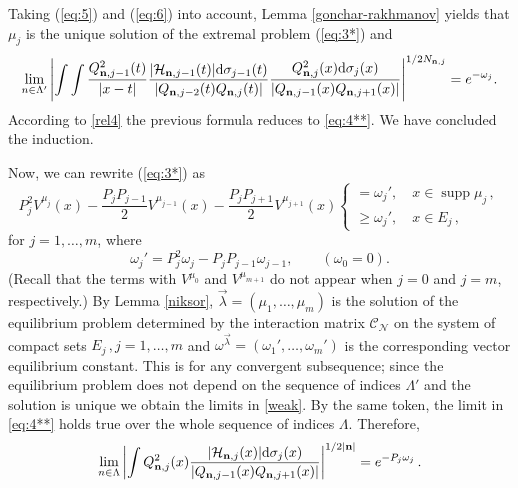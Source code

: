 \documentclass{amsart}
\theoremstyle{definition}
\theoremstyle{remark}
\newcommand{\supp}{\operatorname{supp }}
\begin{document}
\medskip

Taking (\ref{eq:5}) and (\ref{eq:6}) into account, Lemma
\ref{gonchar-rakhmanov} yields that $\mu_j$ is the unique solution
of the extremal problem (\ref{eq:3*}) and
\[  \lim_{n \in \Lambda'} \left|\int   \int \frac{Q_{{\bf n},j-1}^2(t)}{|x-t|}\frac{ |{\mathcal{H}}_{{\bf n},j-1}(t)|{\rm d}\sigma_{j-1}(t)}{|Q_{{\bf n},j-2}(t)Q_{{\bf n},j}(t)|}
\frac{Q_{{\bf n},j}^2(x){\rm d}\sigma_j(x)}{|Q_{{\bf n},j-1}(x)Q_{{\bf n},j+1}(x)|}\right|^{1/2N_{{\bf n},j} } = e^{-\omega_j}.
\]
According to \eqref{rel4} the previous formula reduces to \eqref{eq:4**}. We have concluded the induction.

\medskip

Now, we can rewrite (\ref{eq:3*}) as
\begin{equation} \label{eq:a1}
 P_j^2V^{\mu_j}(x) - \frac{P_jP_{j-1}}{2}V^{\mu_{j-1}}(x) -
\frac{P_jP_{j+1}}{2 }V^{\mu_{j+1}}(x)  \left\{
\begin{array}{l} = \omega_j',\quad x
\in \supp{\mu_j} \,, \\
\geq \omega_j', \quad x \in E_j \,,
\end{array} \right.
\end{equation}
for $j=1,\ldots,m$, where
\begin{equation}\label{eq:c}
\omega_j' =  P_j^2\omega_j -  P_jP_{j-1}\omega_{j-1}, \qquad (\omega_{0} = 0).
\end{equation}
(Recall that the terms with $V^{\mu_0}$ and $V^{\mu_{m+1}}$ do not appear when $j=0$ and $j=m$, respectively.)
By Lemma \ref{niksor},
$\vec{\lambda} = (\mu_{1},\ldots,\mu_{m})$ is the solution of the equilibrium  problem determined by the
interaction matrix $\mathcal{C}_{\mathcal{N}}$ on the system of compact sets
$E_j\,, j = 1,\ldots,m$ and $\omega^{\vec{\lambda}} = (\omega_{1}',\ldots,\omega_{m}') $  is the corresponding vector equilibrium constant.  This is
for any convergent subsequence; since the equilibrium problem does not depend on the sequence of indices $\Lambda'$  and the solution is unique we  obtain the limits in \eqref{weak}. By the same token, the limit in \eqref{eq:4**} holds true over the whole sequence of indices $\Lambda$. Therefore,
\begin{equation} \label{eq:4***}
\lim_{n \in \Lambda} \left|\int  {Q_{{\bf n},j}^2(x)} \frac{|\mathcal{H}_{{\bf n},j}(x)| {\rm d}\sigma_j(x)}{|Q_{{\bf n},j-1}(x)Q_{{\bf n},j+1}(x)|} \right|^{1/2|{\bf n}|} = e^{-P_j\omega_j}\,.
\end{equation}

\medskip
\end{document}

